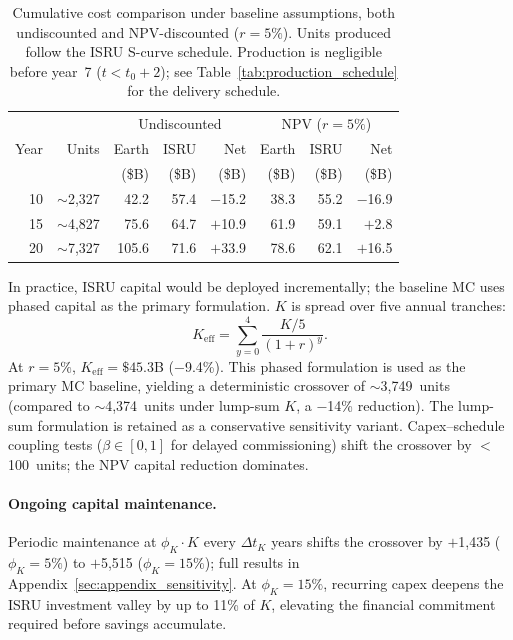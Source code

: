 \documentclass[preprint,12pt]{elsarticle}
\begin{document}
\begin{table}[htbp]
\centering
\caption{Cumulative cost comparison under baseline assumptions, both undiscounted and NPV-discounted ($r = 5\%$). Units produced follow the ISRU S-curve schedule. Production is negligible before year~7 ($t < t_0 + 2$); see Table~\ref{tab:production_schedule} for the delivery schedule.}
\label{tab:cumulative}
\begin{tabular}{@{}rr|rrr|rrr@{}}
\toprule
 & & \multicolumn{3}{c|}{Undiscounted} & \multicolumn{3}{c}{NPV ($r = 5\%$)} \\
Year & Units & Earth & ISRU & Net & Earth & ISRU & Net \\
 & & (\$B) & (\$B) & (\$B) & (\$B) & (\$B) & (\$B) \\
\midrule
10 & $\sim$2{,}327 & 42.2  & 57.4   & $-$15.2 & 38.3  & 55.2  & $-$16.9 \\
15 & $\sim$4{,}827 & 75.6  & 64.7   & $+$10.9 & 61.9  & 59.1  & $+$2.8  \\
20 & $\sim$7{,}327 & 105.6 & 71.6   & $+$33.9 & 78.6  & 62.1  & $+$16.5 \\
\bottomrule
\end{tabular}
\end{table}

In practice, ISRU capital would be deployed incrementally; the baseline MC uses phased capital as the primary formulation. $K$ is spread over five annual tranches:
\begin{equation}
  K_{\mathrm{eff}} = \sum_{y=0}^{4} \frac{K/5}{(1+r)^y}.
  \label{eq:phased_capital}
\end{equation}
At $r = 5\%$, $K_{\mathrm{eff}} = \$45.3$B ($-$9.4\%). This phased formulation is used as the primary MC baseline, yielding a deterministic crossover of $\sim$3{,}749~units (compared to $\sim$4{,}374~units under lump-sum $K$, a $-$14\% reduction). The lump-sum formulation is retained as a conservative sensitivity variant. Capex--schedule coupling tests ($\beta \in [0, 1]$ for delayed commissioning) shift the crossover by $<$100~units; the NPV capital reduction dominates.

\paragraph{Ongoing capital maintenance.} Periodic maintenance at $\phi_K \cdot K$ every $\Delta t_K$ years shifts the crossover by $+$1{,}435 ($\phi_K = 5\%$) to $+$5{,}515 ($\phi_K = 15\%$); full results in Appendix~\ref{sec:appendix_sensitivity}. At $\phi_K = 15\%$, recurring capex deepens the ISRU investment valley by up to 11\% of $K$, elevating the financial commitment required before savings accumulate.
\end{document}
